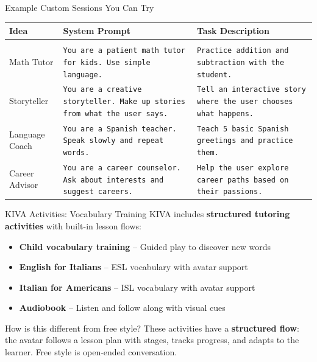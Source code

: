 \documentclass[aspectratio=169]{beamer}
\begin{document}
\begin{frame}{Example Custom Sessions You Can Try}
\footnotesize
\begin{tabular}{@{}p{2.8cm}p{4.8cm}p{4.8cm}@{}}
\textbf{Idea} & \textbf{System Prompt} & \textbf{Task Description} \\[0.1cm]
\hline
\\[-0.2cm]
Math Tutor &
\texttt{You are a patient math tutor for kids. Use simple language.} &
\texttt{Practice addition and subtraction with the student.} \\[0.2cm]
Storyteller &
\texttt{You are a creative storyteller. Make up stories from what the user says.} &
\texttt{Tell an interactive story where the user chooses what happens.} \\[0.2cm]
Language Coach &
\texttt{You are a Spanish teacher. Speak slowly and repeat words.} &
\texttt{Teach 5 basic Spanish greetings and practice them.} \\[0.2cm]
Career Advisor &
\texttt{You are a career counselor. Ask about interests and suggest careers.} &
\texttt{Help the user explore career paths based on their passions.} \\
\end{tabular}
\end{frame}

\begin{frame}{KIVA Activities: Vocabulary Training}
KIVA includes \textbf{structured tutoring activities} with built-in lesson flows:

\vspace{0.3cm}

\begin{itemize}
    \setlength\itemsep{0.4cm}
    \item \textbf{Child vocabulary training} -- Guided play to discover new words
    \item \textbf{English for Italians} -- ESL vocabulary with avatar support
    \item \textbf{Italian for Americans} -- ISL vocabulary with avatar support
    \item \textbf{Audiobook} -- Listen and follow along with visual cues
\end{itemize}

\vspace{0.3cm}

\begin{block}{How is this different from free style?}
These activities have a \textbf{structured flow}: the avatar follows a lesson plan with stages, tracks progress, and adapts to the learner. Free style is open-ended conversation.
\end{block}
\end{frame}
\end{document}
